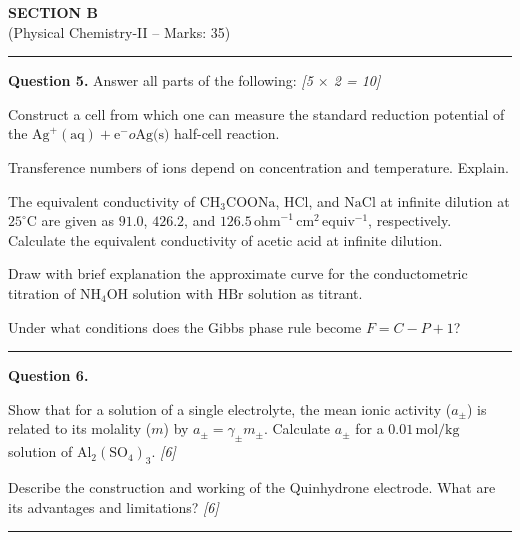 \documentclass[11pt,a4paper]{article}
\newcommand{\pts}[1]{\hfill   \textit{[#1]}}
\begin{document}
\newpage

\begin{center}
  {\large\bfseries SECTION B}\\[2pt]
  {\normalsize (Physical Chemistry-II -- Marks: 35)}
\end{center}
\rule{0.4\linewidth}{0.2pt}
\smallskip




\noindent   \textbf{Question 5.} Answer all parts of the following: \pts{5 $ \times$ 2 = 10}

\begin{parts}
  \item Construct a cell from which one can measure the standard reduction potential of the $ \text{Ag}^+( \text{aq}) +  \text{e}^-  o  \text{Ag(s)}$ half-cell reaction.
  \item Transference numbers of ions depend on concentration and temperature. Explain.
  \item The equivalent conductivity of $ \text{CH}_3 \text{COONa}$, $ \text{HCl}$, and $ \text{NaCl}$ at infinite dilution at $25^\circ \text{C}$ are given as $91.0$, $426.2$, and $126.5\, \text{ohm}^{-1}\, \text{cm}^2\, \text{equiv}^{-1}$, respectively. Calculate the equivalent conductivity of acetic acid at infinite dilution.
  \item Draw with brief explanation the approximate curve for the conductometric titration of $ \text{NH}_4 \text{OH}$ solution with $ \text{HBr}$ solution as titrant.
  \item Under what conditions does the Gibbs phase rule become $F = C - P + 1$?
\end{parts}

\medskip\rule{\linewidth}{0.2pt}




\noindent   \textbf{Question 6.}

\begin{parts}
  \item Show that for a solution of a single electrolyte, the mean ionic activity ($a_\pm$) is related to its molality ($m$) by $a_\pm = \gamma_\pm m_\pm$. Calculate $a_\pm$ for a $0.01\, \text{mol/kg}$ solution of $ \text{Al}_2( \text{SO}_4)_3$. \pts{6}
  \item Describe the construction and working of the Quinhydrone electrode. What are its advantages and limitations? \pts{6}
\end{parts}

\medskip\rule{\linewidth}{0.2pt}
\end{document}
